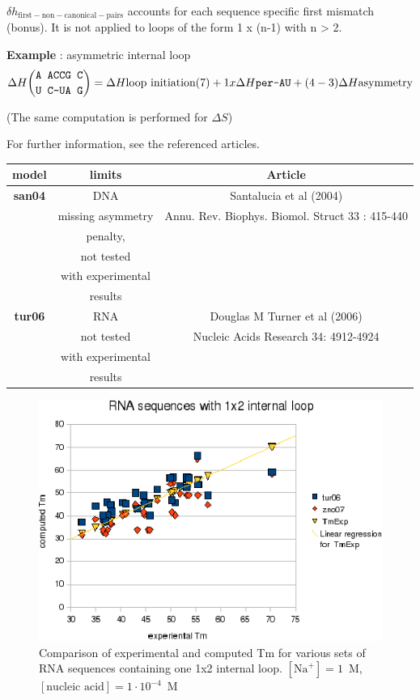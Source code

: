 \documentclass{article}
\begin{document}
$\delta{}h_\mathrm{first-non-canonical-pairs}$ accounts for each sequence
specific first mismatch (bonus). It is not applied to loops of the form 1 x (n-1) with
n > 2.


\textbf{Example} : asymmetric internal loop
\begin{multline*}
\Delta H {\mbox{\texttt{A ACCG C}} \choose \mbox{\texttt{U C-UA G}}} = 
\Delta H {\mbox{loop initiation(7)}} +
1 x \Delta H {\mbox{\texttt{per-AU}}} +
(4 - 3)\Delta H {\mbox{asymmetry}}\\
\end{multline*}

       (The same computation is performed for $\Delta S$)    
       
For further information, see the referenced articles.

\begin{table}[h][c]
\begin{tabular}[h]{| c | c | c |}
\textbf{model} & \textbf{limits} & \textbf{Article} \\
\hline
\textbf{san04} & DNA & Santalucia et al (2004) \\
 & missing asymmetry & Annu. Rev. Biophys. Biomol. Struct 33 : 415-440\\
 & penalty, & \\
 & not tested & \\
 & with experimental & \\
 & results & \\
 \hline
\textbf{tur06} & RNA & Douglas M Turner et al (2006) \\
 & not tested & Nucleic Acids Research 34: 4912-4924 \\
 & with experimental & \\
 & results & \\
 \hline
\end{tabular}
\end{table}

\begin{figure}[h]
\includegraphics[width=1\linewidth]{images/1x2InternalLoop}
\caption{Comparison of experimental and computed Tm for various sets of
 RNA sequences containing one 1x2 internal loop. $[\mbox{Na}^+] = 1$~M, $[\mbox{nucleic acid}] = 1\cdot{}10^{-4}$~M}
\end{figure}
\end{document}
